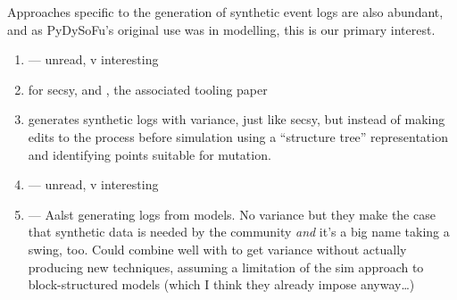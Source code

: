 Approaches specific to the generation of synthetic event logs are also
abundant\cite{stocker2013secsy, pourmasoumi2015business, Loreti_2019,
Yousfi_2015, ExecutableBPMNMitsyuk}, and as PyDySoFu's original use was in
\sociotechnical modelling, this is our primary interest. 


\begin{enumerate}
    \item \cite{Yousfi_2015} --- unread, v interesting
    \item \cite{stocker2013secsy} for secsy, and \cite{stocker2014secsy}, the associated
    tooling paper
    \item \cite{pourmasoumi2015business} generates synthetic logs with variance,
    just like secsy, but instead of making edits to the process before
    simulation using a ``structure tree'' representation and identifying points
    suitable for mutation.
    \item \cite{Loreti_2019} --- unread, v interesting
    \item \cite{ExecutableBPMNMitsyuk} --- Aalst generating logs from models. No
    variance but they make the case that synthetic data is needed by the
    community \emph{and} it's a big name taking a swing, too. Could combine well
    with \cite{pourmasoumi2015business} to get variance without actually
    producing new techniques, assuming a limitation of the sim approach to
    block-structured models (which I think they already impose anyway…)
\end{enumerate}




